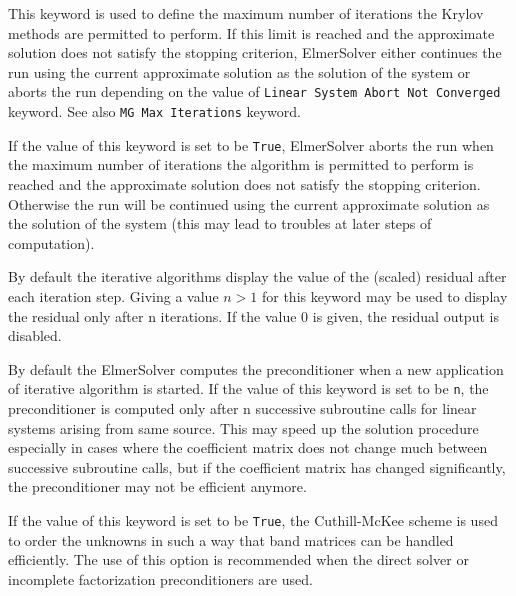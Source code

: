 This keyword is used to define the maximum number of iterations the Krylov methods
are permitted to perform. 
If this limit is reached and the approximate solution does not satisfy the stopping criterion, 
ElmerSolver either continues the run using the current approximate solution as the solution
of the system or aborts the run depending on the value of {\tt Linear System Abort Not Converged}
keyword. See also {\tt MG Max Iterations} keyword.

If the value of this keyword is set to be {\tt True}, ElmerSolver aborts the run when
the maximum number of iterations the algorithm is permitted to perform is reached and 
the approximate solution does not satisfy the stopping criterion. 
Otherwise the run will be continued using the current approximate solution as the solution of 
the system (this may lead to troubles at later steps of computation).  

By default the iterative algorithms display the value of the (scaled) residual after each 
iteration step. Giving a value $n>1$ for this keyword may be used 
to display the residual only after n iterations. If the value 0 is given, the residual output 
is disabled.

By default the ElmerSolver computes the preconditioner when a new application of iterative
algorithm is started. If the value of this keyword is set to be {\tt n}, 
the preconditioner is computed only 
after n successive subroutine calls for linear systems arising from same source.
This may speed up the solution procedure especially in cases where the coefficient matrix does
not change much between successive subroutine calls, but if the coefficient matrix has changed 
significantly, the preconditioner may not be efficient anymore.

If the value of this keyword is set to be {\tt True}, 
the Cuthill-McKee  scheme is used to order the unknowns
in such a way that band matrices can be handled efficiently. 
The use of this option is recommended when the direct solver or incomplete factorization 
preconditioners are used.

